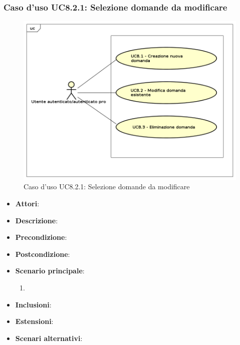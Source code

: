 		\subsubsection{Caso d'uso UC8.2.1: Selezione domande da modificare}
		\label{UC8.2.1}
		\begin{figure}[h]
			\centering
			\includegraphics[scale=0.5,keepaspectratio]{UML/UC8.png}
			\caption{Caso d'uso UC8.2.1: Selezione domande da modificare}
		\end{figure}
		\FloatBarrier
		\begin{itemize}
			\item \textbf{Attori}: 
			\item \textbf{Descrizione}:
			\item \textbf{Precondizione}: 
			\item \textbf{Postcondizione}: 
			\item \textbf{Scenario principale}: 
			\begin{enumerate}
				\item
			\end{enumerate}
			\item \textbf{Inclusioni}: 
			\item \textbf{Estensioni}: 
			\item \textbf{Scenari alternativi}: 
		\end{itemize}











